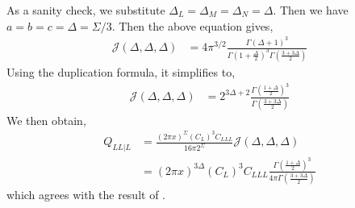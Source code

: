 \documentclass[11pt]{article}
\newcommand{\lb}{\left(}
\newcommand{\rb}{\right)}
\begin{document}
As a sanity check, we substitute $\Delta_L = \Delta_M = \Delta_N = \Delta$. Then we have $a=b=c= \Delta = \Sigma/3$. Then the above equation gives,
\begin{align}
    \mathcal{J}(\Delta,\Delta,\Delta) &= 4\pi^{3/2} \frac{\Gamma\lb\Delta +1\rb^3}{\Gamma\lb 1+ \frac{\Delta}{2}\rb^3\Gamma\lb\frac{3+3\Delta}{2}\rb} 
\end{align}
Using the duplication formula, it simplifies to,
\begin{align}
    \mathcal{J}(\Delta,\Delta,\Delta) &= 2^{3\Delta +2} \frac{\Gamma\lb \frac{1+\Delta}{2}\rb^3}{\Gamma\lb\frac{3+3\Delta}{2}\rb}
\end{align}
We then obtain, 
\begin{align}
    Q_{LL|L} &=  \frac{(2\pi x)^\Sigma (C_L)^3C_{LLL}}{16\pi 2^\Sigma}\mathcal{J}(\Delta,\Delta,\Delta) \\
    &= (2\pi x)^{3\Delta} (C_L)^3C_{LLL} \frac{\Gamma\lb \frac{1+\Delta}{2}\rb^3}{4\pi \Gamma\lb\frac{3+3\Delta}{2}\rb}
\end{align}
which agrees with the result of \cite{S_rosi_2018}. 
\end{document}
